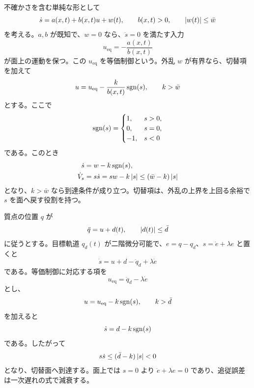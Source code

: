 不確かさを含む単純な形として
\begin{equation}
  \dot{s}=a(x,t)+b(x,t)u+w(t),
  \qquad b(x,t)>0,\qquad \left|w(t)\right|\le\bar{w}
\end{equation}
を考える。$a,b$ が既知で、$w=0$ なら、$\dot{s}=0$ を満たす入力
\begin{equation}
  u_\mathrm{eq}=-\frac{a(x,t)}{b(x,t)}
\end{equation}
が面上の運動を保つ。この $u_\mathrm{eq}$ を等価制御という。外乱 $w$ が有界なら、切替項を加えて
\begin{equation}
  u=u_\mathrm{eq}-\frac{k}{b(x,t)}\operatorname{sgn}(s),
  \qquad k>\bar{w}
\end{equation}
とする。ここで
\begin{equation}
  \operatorname{sgn}(s)=
  \begin{cases}
    1,&s>0,\\
    0,&s=0,\\
    -1,&s<0
  \end{cases}
\end{equation}
である。このとき
\begin{align}
  \dot{s}
  &=w-k\operatorname{sgn}(s),\\
  \dot{V}_s
  &=s\dot{s}
   =sw-k\left|s\right|
   \le(\bar{w}-k)\left|s\right|
\end{align}
となり、$k>\bar{w}$ なら到達条件が成り立つ。切替項は、外乱の上界を上回る余裕で $s$ を面へ戻す役割を持つ。

\begin{example}[不確かな加速度外乱をもつ質点追従]
質点の位置 $q$ が
\begin{equation}
  \ddot{q}=u+d(t),\qquad \left|d(t)\right|\le\bar{d}
\end{equation}
に従うとする。目標軌道 $q_d(t)$ が二階微分可能で、$e=q-q_d$、$s=\dot{e}+\lambda e$ と置くと
\begin{equation}
  \dot{s}
  =
  u+d-\ddot{q}_d+\lambda\dot{e}
\end{equation}
である。等価制御に対応する項を
\begin{equation}
  u_\mathrm{eq}=\ddot{q}_d-\lambda\dot{e}
\end{equation}
とし、
\begin{equation}
  u=u_\mathrm{eq}-k\operatorname{sgn}(s),\qquad k>\bar{d}
\end{equation}
を加えると
\begin{equation}
  \dot{s}=d-k\operatorname{sgn}(s)
\end{equation}
である。したがって
\begin{equation}
  s\dot{s}\le(\bar{d}-k)\left|s\right|<0
\end{equation}
となり、切替面へ到達する。面上では $s=0$ より $\dot{e}+\lambda e=0$ であり、追従誤差は一次遅れの式で減衰する。
\end{example}

